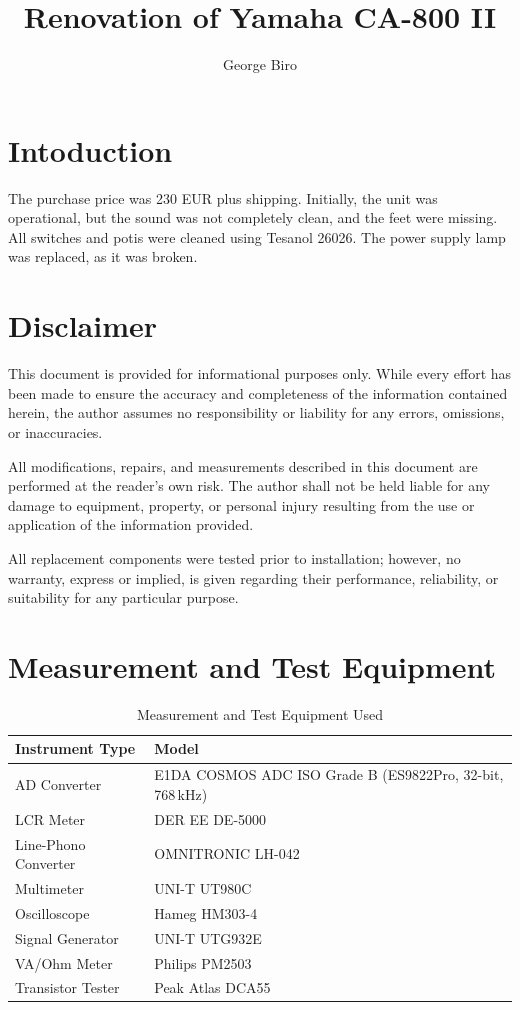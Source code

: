 \documentclass[]{article}
\title{Renovation of Yamaha CA-800 II}
\author{George Biro}
\begin{document}
\maketitle

\begin{abstract}

\end{abstract}

\section{Intoduction}

The purchase price was 230 EUR plus shipping.
Initially, the unit was operational, but the sound was not completely clean, and the feet were missing.
All switches and potis were cleaned using Tesanol 26026. The power supply lamp was replaced, as it was broken.

\section{Disclaimer}

This document is provided for informational purposes only. While every effort has been made to ensure the accuracy and completeness of the information contained herein, the author assumes no responsibility or liability for any errors, omissions, or inaccuracies.

All modifications, repairs, and measurements described in this document are performed at the reader's own risk. The author shall not be held liable for any damage to equipment, property, or personal injury resulting from the use or application of the information provided.

All replacement components were tested prior to installation; however, no warranty, express or implied, is given regarding their performance, reliability, or suitability for any particular purpose.

\section{Measurement and Test Equipment}

\begin{table}[H]
	\centering
	\caption{Measurement and Test Equipment Used}
	\label{tab:tools}
	\begin{tabular}{ll}
		\hline
		\textbf{Instrument Type} & \textbf{Model} \\
		\hline
		AD Converter & E1DA COSMOS ADC ISO Grade B (ES9822Pro, 32-bit, 768\,kHz) \\
		LCR Meter & DER EE DE-5000 \\
		Line-Phono Converter & OMNITRONIC LH-042 \\
		Multimeter & UNI-T UT980C \\
		Oscilloscope & Hameg HM303-4 \\
		Signal Generator & UNI-T UTG932E \\
		VA/Ohm Meter & Philips PM2503 \\
        Transistor Tester & Peak Atlas DCA55 \\
		\hline
	\end{tabular}
\end{table}
\end{document}
